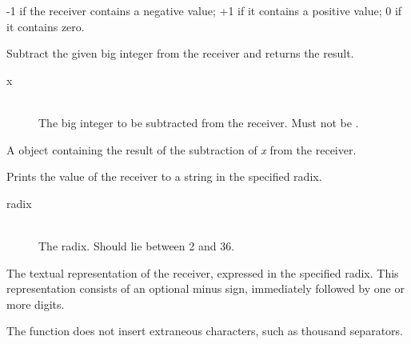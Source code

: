 
\docretval

-1 if the receiver contains a negative value; +1 if it contains a positive value; 0 if it contains zero.



Subtract the given big integer from the receiver and returns the result.


\docparams

\begin{description}
\item[x] \hfill \\ The big integer to be subtracted from the receiver. Must not be .
\end{description}

\docretval

A  object containing the result of the subtraction of \emph{x} from the receiver.



Prints the value of the receiver to a string in the specified radix.


\docparams

\begin{description}
\item[radix] \hfill \\ The radix. Should lie between 2 and 36.
\end{description}

\docretval

The textual representation of the receiver, expressed in the specified radix. This representation consists of an optional minus sign, immediately followed by one or more digits.

\docdiscuss

The function does not insert extraneous characters, such as thousand separators.

